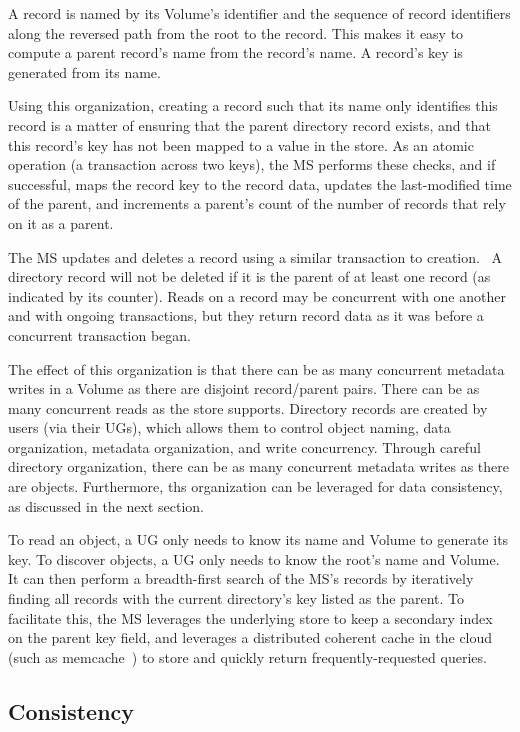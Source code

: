 A record is named by its Volume's identifier and the sequence of record identifiers along the reversed path from the root to the record. This makes it easy to compute a parent record's name from the record's name. A record's key is generated from its name.

Using this organization, creating a record such that its name only identifies this record is a matter of ensuring that the parent directory record exists, and that this record's key has not been mapped to a value in the store. As an atomic operation (a transaction across two keys), the MS performs these checks, and if successful, maps the record key to the record data, updates the last-modified time of the parent, and increments a parent's count of the number of records that rely on it as a parent.

The MS updates and deletes a record using a similar transaction to creation.  A directory record will not be deleted if it is the parent of at least one record (as indicated by its counter). Reads on a record may be concurrent with one another and with ongoing transactions, but they return record data as it was before a concurrent transaction began.

The effect of this organization is that there can be as many concurrent metadata writes in a Volume as there are disjoint record/parent pairs. There can be as many concurrent reads as the store supports. Directory records are created by users (via their UGs), which allows them to control object naming, data organization, metadata organization, and write concurrency. Through careful directory organization, there can be as many concurrent metadata writes as there are objects. Furthermore, ths organization can be leveraged for data consistency, as discussed in the next section.

To read an object, a UG only needs to know its name and Volume to generate its key. To discover objects, a UG only needs to know the root's name and Volume. It can then perform a breadth-first search of the MS's records by iteratively finding all records with the current directory's key listed as the parent. To facilitate this, the MS leverages the underlying store to keep a secondary index on the parent key field, and leverages a distributed coherent cache in the cloud (such as memcache~\cite{memcache}) to store and quickly return frequently-requested queries.

\subsection{Consistency}

